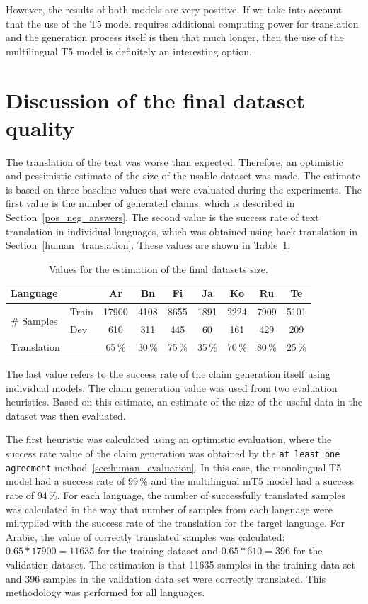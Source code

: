 However, the results of both models are very positive. If we take into account that the use of the T5 model requires additional computing power for translation and the generation process itself is then that much longer, then the use of the multilingual T5 model is definitely an interesting option.

\section{Discussion of the final dataset quality}
The translation of the text was worse than expected. Therefore, an optimistic and pessimistic estimate of the size of the usable dataset was made. The estimate is based on three baseline values that were evaluated during the experiments. The first value is the number of generated claims, which is described in Section~\ref{pos_neg_answers}. The second value is the success rate of text translation in individual languages, which was obtained using back translation in Section~\ref{human_translation}. These values are shown in Table~\ref{tab:dataset_quality}.

\begin{table}[H]
    \centering
    \begin{tabular}{l|lccccccc}
        \hline
        Language & & Ar & Bn & Fi & Ja & Ko & Ru & Te \\
        \hline
        \multirow{2}{*}{\# Samples} & Train & 17900 & 4108 & 8655 & 1891 & 2224 & 7909 & 5101 \\
         & Dev & 610 & 311 & 445 & 60 & 161 & 429 & 209 \\
        Translation & & 65\,\% & 30\,\% & 75\,\% & 35\,\% & 70\,\% & 80\,\% & 25\,\% \\
        \hline
    \end{tabular}
    \caption{Values for the estimation of the final datasets size.}
    \label{tab:dataset_quality}
\end{table}

The last value refers to the success rate of the claim generation itself using individual models. The claim generation value was used from two evaluation heuristics. Based on this estimate, an estimate of the size of the useful data in the dataset was then evaluated.

The first heuristic was calculated using an optimistic evaluation, where the success rate value of the claim generation was obtained by the \texttt{at least one agreement} method~\ref{sec:human_evaluation}. In this case, the monolingual T5 model had a success rate of 99\,\% and the multilingual mT5 model had a success rate of 94\,\%. For each language, the number of successfully translated samples was calculated in the way that number of samples from each language were miltyplied with the success rate of the translation for the target language. For Arabic, the value of correctly translated samples was calculated: $0.65 * 17900 = 11635$ for the training dataset and $0.65 * 610 = 396$ for the validation dataset. The estimation is that 11635 samples in the training data set and 396 samples in the validation data set were correctly translated. This methodology was performed for all languages.

